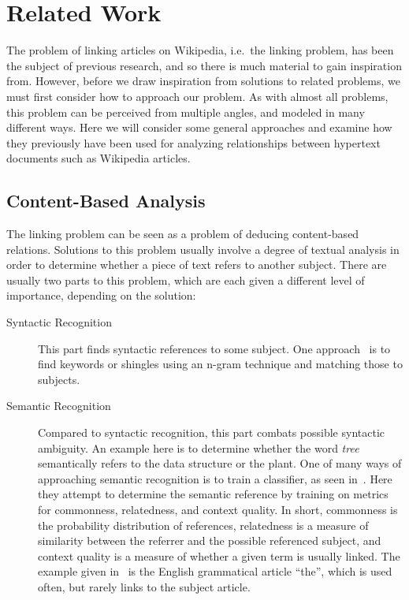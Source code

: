 \section{Related Work}\label{sec:related_work}
The problem of linking articles on Wikipedia, i.e.\ the linking problem, has been the subject of previous research, and so there is much material to gain inspiration from. However, before we draw inspiration from solutions to related problems, we must first consider how to approach our problem. As with almost all problems, this problem can be perceived from multiple angles, and modeled in many different ways. Here we will consider some general approaches and examine how they previously have been used for analyzing relationships between hypertext documents such as Wikipedia articles.

\subsection{Content-Based Analysis}\label{related_semantic_contextual}
The linking problem can be seen as a problem of deducing content-based relations. Solutions to this problem usually involve a degree of textual analysis in order to determine whether a piece of text refers to another subject. There are usually two parts to this problem, which are each given a different level of importance, depending on the solution:

\begin{description}
  \item[Syntactic Recognition] This part finds syntactic references to some subject. One approach~\cite{mihalcea2007wikify} is to find keywords or shingles using an n-gram technique and matching those to subjects.

  \item[Semantic Recognition] Compared to syntactic recognition, this part combats possible syntactic ambiguity. An example here is to determine whether the word \emph{tree} semantically refers to the data structure or the plant. One of many ways of approaching semantic recognition is to train a classifier, as seen in~\cite{milne2008learning}. Here they attempt to determine the semantic reference by training on metrics for commonness, relatedness, and context quality. In short, commonness is the probability distribution of references, relatedness is a measure of similarity between the referrer and the possible referenced subject, and context quality is a measure of whether a given term is usually linked. The example given in~\cite{milne2008learning} is the English grammatical article \enquote{the}, which is used often, but rarely links to the subject article.
\end{description}


